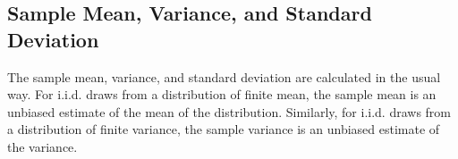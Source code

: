 \begin{description}
\begin{description}
\begin{description}
\begin{description}
\begin{description}
\begin{description}
\begin{description}
\begin{description}
\begin{description}
\begin{description}
\begin{description}
\begin{description}
\begin{description}
\begin{description}
\begin{description}
\begin{description}
\begin{description}
\begin{description}
\begin{description}
\begin{description}
\begin{description}
\begin{description}
\begin{description}
\begin{description}
\begin{description}
\begin{description}
\begin{description} %



\subsection{Sample Mean, Variance, and Standard Deviation}

The sample mean, variance, and standard deviation are calculated in the usual way.  For i.i.d. draws from a distribution of finite mean, the sample mean is an unbiased estimate of the mean of the distribution.  Similarly, for i.i.d. draws from a distribution of finite variance, the sample variance is an unbiased estimate of the variance.%


\end{description}
\end{description}
\end{description}
\end{description}
\end{description}
\end{description}
\end{description}
\end{description}
\end{description}
\end{description}
\end{description}
\end{description}
\end{description}
\end{description}
\end{description}
\end{description}
\end{description}
\end{description}
\end{description}
\end{description}
\end{description}
\end{description}
\end{description}
\end{description}
\end{description}
\end{description}
\end{description}
